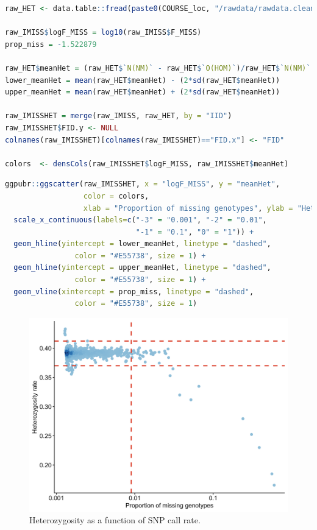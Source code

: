 \documentclass[
]{book}
\begin{document}
\begin{lstlisting}[language=R]
raw_HET <- data.table::fread(paste0(COURSE_loc, "/rawdata/rawdata.clean.ultraclean.het"))

raw_IMISS$logF_MISS = log10(raw_IMISS$F_MISS)
prop_miss = -1.522879

raw_HET$meanHet = (raw_HET$`N(NM)` - raw_HET$`O(HOM)`)/raw_HET$`N(NM)`
lower_meanHet = mean(raw_HET$meanHet) - (2*sd(raw_HET$meanHet))
upper_meanHet = mean(raw_HET$meanHet) + (2*sd(raw_HET$meanHet))

raw_IMISSHET = merge(raw_IMISS, raw_HET, by = "IID")
raw_IMISSHET$FID.y <- NULL
colnames(raw_IMISSHET)[colnames(raw_IMISSHET)=="FID.x"] <- "FID"

colors  <- densCols(raw_IMISSHET$logF_MISS, raw_IMISSHET$meanHet)
\end{lstlisting}

\begin{lstlisting}[language=R]
ggpubr::ggscatter(raw_IMISSHET, x = "logF_MISS", y = "meanHet",
                  color = colors,
                  xlab = "Proportion of missing genotypes", ylab = "Heterozygosity rate") +
  scale_x_continuous(labels=c("-3" = "0.001", "-2" = "0.01",
                              "-1" = "0.1", "0" = "1")) +
  geom_hline(yintercept = lower_meanHet, linetype = "dashed",
                color = "#E55738", size = 1) +
  geom_hline(yintercept = upper_meanHet, linetype = "dashed",
                color = "#E55738", size = 1) +
  geom_vline(xintercept = prop_miss, linetype = "dashed",
                color = "#E55738", size = 1)
\end{lstlisting}

\begin{figure}

{\centering \includegraphics[width=18.67in]{img/_gwas/show-heterozygosity} 

}

\caption{Heterozygosity as a function of SNP call rate.}\label{fig:show-heterozygosity}
\end{figure}
\end{document}
